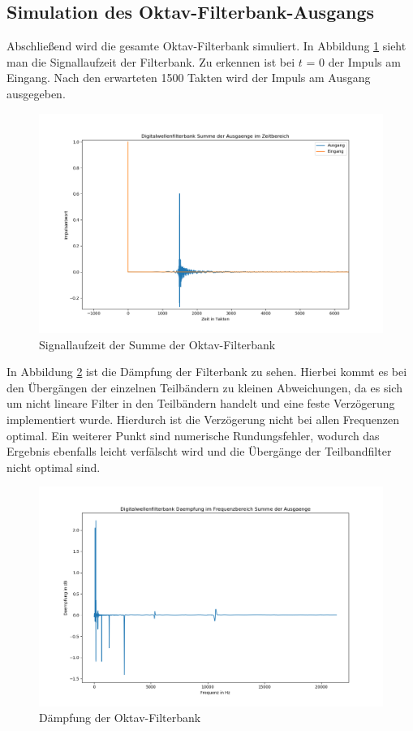 \subsection{Simulation des Oktav-Filterbank-Ausgangs}
Abschließend wird die gesamte Oktav-Filterbank simuliert. In Abbildung \ref{fig:OktavLaufzeit} sieht man die Signallaufzeit der Filterbank. Zu erkennen ist bei $t$ = 0 der Impuls am Eingang. Nach den erwarteten 1500 Takten wird der Impuls am Ausgang ausgegeben.\par
\begin{figure}[h!]
	\centering	\includegraphics[width=14cm]{img/bank_zeit_summe.png}
	\caption{Signallaufzeit der Summe der Oktav-Filterbank}
	\label{fig:OktavLaufzeit}
\end{figure}
In Abbildung \ref{fig:AusgangDeampfung} ist die Dämpfung der Filterbank zu sehen. Hierbei kommt es bei den Übergängen der einzelnen Teilbändern zu kleinen Abweichungen, da es sich um nicht lineare Filter in den Teilbändern handelt und eine feste Verzögerung implementiert wurde. Hierdurch ist die Verzögerung nicht bei allen Frequenzen optimal. Ein weiterer Punkt sind numerische Rundungsfehler, wodurch das Ergebnis ebenfalls leicht verfälscht wird und die Übergänge der Teilbandfilter nicht optimal sind.
\begin{figure}[h!]
	\centering	\includegraphics[width=14cm]{img/bank_freq_summe.png}
	\caption{Dämpfung der Oktav-Filterbank}
	\label{fig:AusgangDeampfung}
\end{figure}